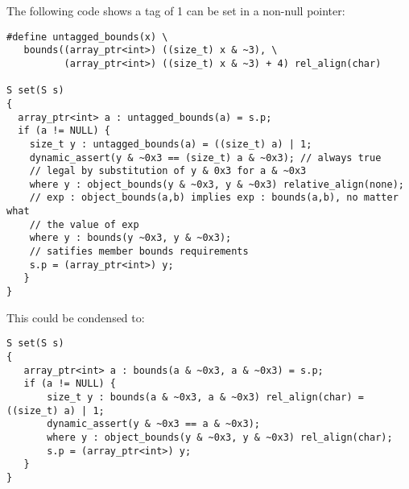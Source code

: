 The following code shows a tag of 1 can be set in a non-null pointer:

\begin{verbatim}
#define untagged_bounds(x) \
   bounds((array_ptr<int>) ((size_t) x & ~3), \
          (array_ptr<int>) ((size_t) x & ~3) + 4) rel_align(char)

S set(S s) 
{
  array_ptr<int> a : untagged_bounds(a) = s.p;
  if (a != NULL) {
    size_t y : untagged_bounds(a) = ((size_t) a) | 1;
    dynamic_assert(y & ~0x3 == (size_t) a & ~0x3); // always true
    // legal by substitution of y & 0x3 for a & ~0x3
    where y : object_bounds(y & ~0x3, y & ~0x3) relative_align(none);
    // exp : object_bounds(a,b) implies exp : bounds(a,b), no matter what
    // the value of exp
    where y : bounds(y ~0x3, y & ~0x3);
    // satifies member bounds requirements
    s.p = (array_ptr<int>) y;
   }
}
\end{verbatim}

This could be condensed to:
\begin{verbatim}
S set(S s) 
{
   array_ptr<int> a : bounds(a & ~0x3, a & ~0x3) = s.p;
   if (a != NULL) {
       size_t y : bounds(a & ~0x3, a & ~0x3) rel_align(char) = ((size_t) a) | 1;
       dynamic_assert(y & ~0x3 == a & ~0x3);
       where y : object_bounds(y & ~0x3, y & ~0x3) rel_align(char);
       s.p = (array_ptr<int>) y;
   }
} 
\end{verbatim}